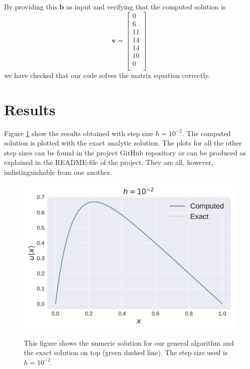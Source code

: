 \documentclass[reprint, english,notitlepage]{revtex4-1}  %
\begin{document}
By providing this $\boldsymbol b$ as input and verifying that the computed solution is
\begin{equation*}
  \boldsymbol v
=
\begin{bmatrix}
0 \\
6 \\
11 \\
14  \\
14  \\
10  \\
0 \\
\end{bmatrix}
\end{equation*}
we have checked that our code solves the matrix equation correctly.



\section{Results}

Figure \ref{fig:slow_2} show the results obtained with step size $h = 10^{-2}$. The computed solution is plotted with the exact analytic solution. The plots for all the other step sizes can be found in the project GitHub repository \citep{github} or can be produced as explained in the README-file of the project. They are all, however, indistinguishable from one another.

\begin{figure}[h]
	\centering
  \includegraphics[width=\linewidth]{../output/slow_2.pdf}
	\label{fig:slow_2}
	\caption{This figure shows the numeric solution for our general algorithm and the exact solution on top (green dashed line). The step size used is $h=10^{-2}$.}
\end{figure}
\end{document}
